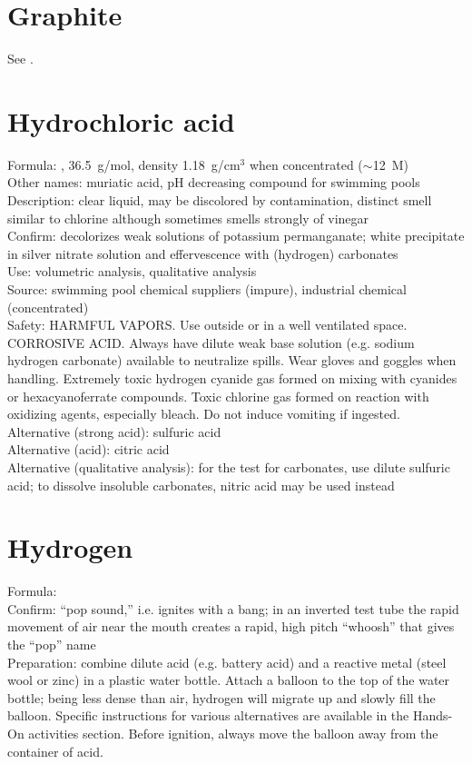 \section{Graphite}
See .

\section{Hydrochloric acid}
\label{sec:hydroacid}
Formula: , 
36.5~g/mol, 
density 1.18~g/cm$^{3}$ when concentrated ($\sim$12~M)\\
Other names: muriatic acid, 
pH decreasing compound for swimming pools\\
Description: clear liquid, 
may be discolored by contamination, 
distinct smell similar to chlorine 
although sometimes smells strongly of vinegar\\
Confirm: decolorizes weak solutions of potassium permanganate; 
white precipitate in silver nitrate solution 
and effervescence with (hydrogen) carbonates\\
Use: volumetric analysis, 
qualitative analysis\\
Source: swimming pool chemical suppliers (impure), industrial chemical (concentrated)\\ 
Safety: HARMFUL VAPORS. 
Use outside or in a well ventilated space. 
CORROSIVE ACID. 
Always have dilute weak base solution (e.g. 
sodium hydrogen carbonate) available to neutralize spills. 
Wear gloves and goggles when handling. 
Extremely toxic hydrogen cyanide gas formed 
on mixing with cyanides or hexacyanoferrate compounds. 
Toxic chlorine gas formed on reaction with oxidizing agents, 
especially bleach. 
Do not induce vomiting if ingested.\\
Alternative (strong acid): sulfuric acid\\
Alternative (acid): citric acid\\
Alternative (qualitative analysis): for the test for carbonates, 
use dilute sulfuric acid; 
to dissolve insoluble carbonates, 
nitric acid may be used instead

\section{Hydrogen}
Formula: \\
Confirm: ``pop sound,'' i.e. 
ignites with a bang; 
in an inverted test tube the rapid movement of air 
near the mouth creates a rapid, 
high pitch ``whoosh'' that gives the ``pop'' name\\
Preparation: combine dilute acid (e.g. 
battery acid) and a reactive metal (steel wool or zinc) 
in a plastic water bottle. 
Attach a balloon to the top of the water bottle; 
being less dense than air, 
hydrogen will migrate up and slowly fill the balloon. 
Specific instructions for various alternatives are available 
in the Hands-On activities section. 
Before ignition, 
always move the balloon away from the container of acid.

